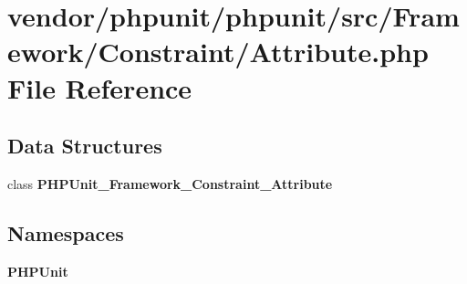 \section{vendor/phpunit/phpunit/src/\+Framework/\+Constraint/\+Attribute.php File Reference}
\label{_attribute_8php}
\subsection*{Data Structures}
\begin{DoxyCompactItemize}
\item 
class {\bf P\+H\+P\+Unit\+\_\+\+Framework\+\_\+\+Constraint\+\_\+\+Attribute}
\end{DoxyCompactItemize}
\subsection*{Namespaces}
\begin{DoxyCompactItemize}
\item 
 {\bf P\+H\+P\+Unit}
\end{DoxyCompactItemize}
